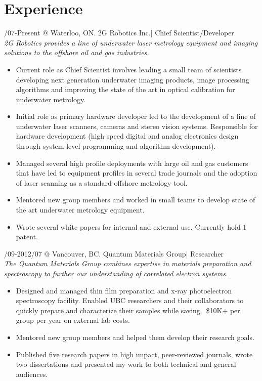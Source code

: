\documentclass[10pt,letterpaper]{resume}
\begin{document}
\maketitle

\section{Experience}

/07-Present @ Waterloo, ON. 2G Robotics Inc.| Chief Scientist/Developer
\textit{\\2G Robotics provides a line of underwater laser metrology equipment and imaging solutions to the offshore oil and gas industries.}
\begin{itemize}
\item Current role as Chief Scientist involves leading a small team of scientists developing next generation underwater imaging products, image processing algorithms and improving the state of the art in optical calibration for underwater metrology.
\item Initial role as primary hardware developer led to the development of a line of underwater laser scanners, cameras and stereo vision systems. Responsible for hardware development (high speed digital and analog electronics design through system level programming and algorithm development).
\item Managed several high profile deployments with large oil and gas customers that have led to equipment profiles in several trade journals and the adoption of laser scanning as a standard offshore metrology tool.
\item Mentored new group members and worked in small teams to develop state of the art underwater metrology equipment.
\item Wrote several white papers for internal and external use. Currently hold 1 patent.
\end{itemize}

/09-2012/07 @ Vancouver, BC. Quantum Materials Group| Researcher
\textit{\\The Quantum Materials Group combines expertise in materials preparation and spectroscopy to further our understanding of correlated electron systems.}
\begin{itemize}
\item Designed and managed thin film preparation and x-ray photoelectron spectroscopy facility. Enabled UBC researchers and their collaborators to quickly prepare and characterize their samples while saving ~\$10K+ per group per year on external lab costs.
\item Mentored new group members and helped them develop their research goals.
\item Published five research papers in high impact, peer-reviewed journals, wrote two dissertations and presented my work to both technical and general audiences.
\end{itemize}
\end{document}
